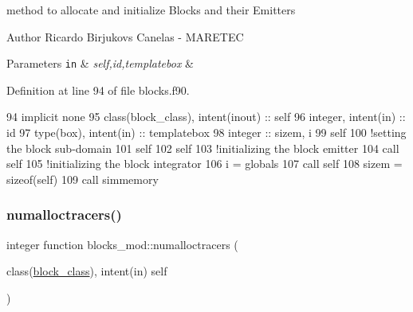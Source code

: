 method to allocate and initialize Blocks and their Emitters 

\begin{DoxyAuthor}{Author}
Ricardo Birjukovs Canelas -\/ M\+A\+R\+E\+T\+EC 
\end{DoxyAuthor}

\begin{DoxyParams}[1]{Parameters}
\mbox{\tt in}  & {\em self,id,templatebox} & \\
\hline
\end{DoxyParams}


Definition at line 94 of file blocks.\+f90.


\begin{DoxyCode}
94     \textcolor{keywordtype}{implicit none}
95     \textcolor{keywordtype}{class}(block\_class), \textcolor{keywordtype}{intent(inout)} :: self
96     \textcolor{keywordtype}{integer}, \textcolor{keywordtype}{intent(in)} :: id
97     \textcolor{keywordtype}{type}(box), \textcolor{keywordtype}{intent(in)} :: templatebox
98     \textcolor{keywordtype}{integer} :: sizem, i
99     self%
100     \textcolor{comment}{!setting the block sub-domain}
101     self%
102     self%
103     \textcolor{comment}{!initializing the block emitter}
104     \textcolor{keyword}{call }self%
105     \textcolor{comment}{!initializing the block integrator}
106     i = globals%
107     \textcolor{keyword}{call }self%
108     sizem = sizeof(self)
109     \textcolor{keyword}{call }simmemory%
\end{DoxyCode}
\mbox{\label{namespaceblocks__mod_a7202fad0fdc07ff9111e61e3aa513af9}} 
\subsubsection{\texorpdfstring{numalloctracers()}{numalloctracers()}}
{\footnotesize\ttfamily integer function blocks\+\_\+mod\+::numalloctracers (\begin{DoxyParamCaption}\item[{class(\mbox{\hyperlink{structblocks__mod_1_1block__class}{block\+\_\+class}}), intent(in)}]{self }\end{DoxyParamCaption})\hspace{0.3cm}{\ttfamily [private]}}



